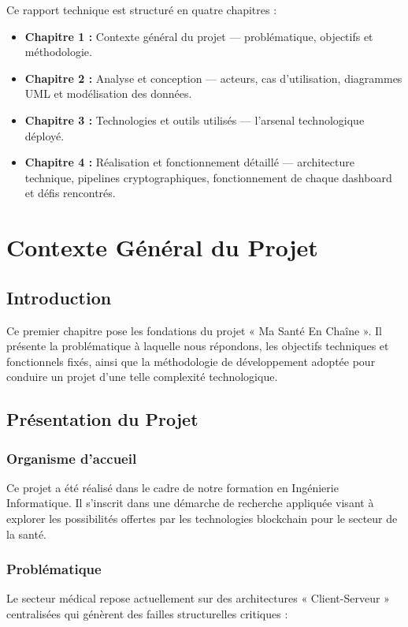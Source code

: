 \documentclass[12pt,a4paper]{report}
\begin{document}
Ce rapport technique est structuré en quatre chapitres :
\begin{itemize}
    \item \textbf{Chapitre 1 :} Contexte général du projet — problématique, objectifs et méthodologie.
    \item \textbf{Chapitre 2 :} Analyse et conception — acteurs, cas d'utilisation, diagrammes UML et modélisation des données.
    \item \textbf{Chapitre 3 :} Technologies et outils utilisés — l'arsenal technologique déployé.
    \item \textbf{Chapitre 4 :} Réalisation et fonctionnement détaillé — architecture technique, pipelines cryptographiques, fonctionnement de chaque dashboard et défis rencontrés.
\end{itemize}
\chapter{Contexte Général du Projet}

\section{Introduction}
Ce premier chapitre pose les fondations du projet « Ma Santé En Chaîne ». Il présente la problématique à laquelle nous répondons, les objectifs techniques et fonctionnels fixés, ainsi que la méthodologie de développement adoptée pour conduire un projet d'une telle complexité technologique.

\section{Présentation du Projet}

\subsection{Organisme d'accueil}
Ce projet a été réalisé dans le cadre de notre formation en Ingénierie Informatique. Il s'inscrit dans une démarche de recherche appliquée visant à explorer les possibilités offertes par les technologies blockchain pour le secteur de la santé.

\subsection{Problématique}
Le secteur médical repose actuellement sur des architectures « Client-Serveur » centralisées qui génèrent des failles structurelles critiques :
\end{document}
